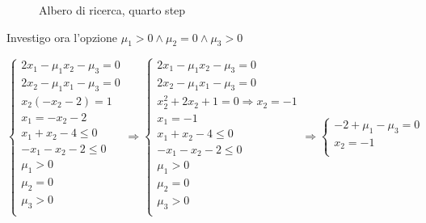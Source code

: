 \documentclass[\main/main.tex]{subfiles}
\begin{document}
\begin{figure}
  \caption{Albero di ricerca, quarto step}
\end{figure}

Investigo ora l'opzione $\mu_1>0 \land \mu_2=0 \land \mu_3 > 0$

\[
  \begin{cases}
    2x_1-\mu_1x_2  - \mu_3 = 0 \\
    2x_2-\mu_1x_1  - \mu_3 = 0 \\
    x_2(-x_2 - 2) = 1          \\
    x_1 = -x_2 - 2             \\
    x_1 + x_2 -4 \leq 0        \\
    -x_1 - x_2 - 2 \leq 0      \\
    \mu_1 > 0                  \\
    \mu_2 = 0                  \\
    \mu_3 > 0                  \\
  \end{cases}
  \Rightarrow
  \begin{cases}
    2x_1-\mu_1x_2  - \mu_3 = 0              \\
    2x_2-\mu_1x_1  - \mu_3 = 0              \\
    x^2_2 + 2x_2 +1= 0 \Rightarrow x_2 = -1 \\
    x_1 = - 1                               \\
    x_1 + x_2 -4 \leq 0                     \\
    -x_1 - x_2 - 2 \leq 0                   \\
    \mu_1 > 0                               \\
    \mu_2 = 0                               \\
    \mu_3 > 0                               \\
  \end{cases}
  \Rightarrow
  \begin{cases}
    -2+\mu_1  - \mu_3 = 0 \\
    x_2 = -1              \\

\end{cases}\]
\end{document}
